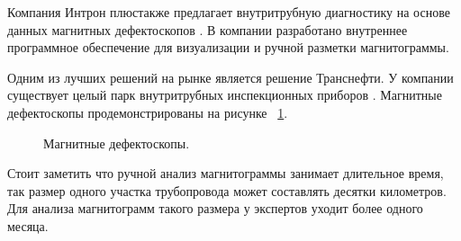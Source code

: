 \documentclass[a4paper,article,14pt]{extarticle}
\begin{document}
Компания \frqq Интрон плюс\flqq также предлагает внутритрубную диагностику на основе данных магнитных дефектоскопов \cite{s3}. 
В компании разработано внутреннее программное обеспечение для визуализации и ручной разметки магнитограммы. 

Одним из лучших решений на рынке является решение Транснефти. У компании существует целый парк внутритрубных инспекционных 
приборов \cite{s4}. 
Магнитные дефектоскопы продемонстрированы на рисунке ~\ref{image2}.

\begin{figure}[ht]
    \begin{center}
    
    \caption{
    \label{image2}
    Магнитные дефектоскопы.}
    \end {center}
\end {figure}

Стоит заметить что ручной анализ магнитограммы занимает длительное время, так размер одного участка трубопровода 
может составлять десятки километров. Для анализа магнитограмм такого размера у экспертов уходит более одного месяца.
\end{document}
